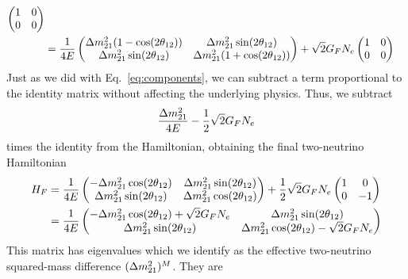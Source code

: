 \begin{align}
            \begin{pmatrix}
            1 & 0 \\
            0 & 0 \\
        \end{pmatrix} \nonumber \\
            &= 
        \frac{1}{4E}
            \begin{pmatrix}
                \dm_{21} (1-\cos(2\theta_{12}))& \dm_{21}  \sin(2\theta_{12}) \\ 
                \dm_{21}  \sin(2\theta_{12}) & \dm_{21} (1+\cos(2\theta_{12})) \\ 
            \end{pmatrix} + \sqrt{2}G_F N_e 
            \begin{pmatrix}
            1 & 0 \\
            0 & 0 \\
        \end{pmatrix}
\end{align}
Just as we did with Eq.~\ref{eq:components}, we can subtract a term proportional to the identity matrix without affecting the underlying physics. Thus, we subtract
\begin{align}
    \frac{\dm[21]}{4E} - \frac{1}{2}\sqrt{2}G_F N_e
\end{align}
times the identity from the Hamiltonian, obtaining the final two-neutrino Hamiltonian
\begin{align}
    H_F &= \frac{1}{4E}
    \begin{pmatrix}
        -\dm_{21} \cos(2\theta_{12}) & \dm_{21}  \sin(2\theta_{12}) \\ 
        \dm_{21}  \sin(2\theta_{12}) & \dm_{21} \cos(2\theta_{12}) \\ 
    \end{pmatrix} + \frac{1}{2}\sqrt{2}G_F N_e 
    \begin{pmatrix}
    1 & 0 \\
    0 & -1 \\
    \end{pmatrix} \nonumber \\
    &= \frac{1}{4E}
    \begin{pmatrix}
        -\dm_{21} \cos(2\theta_{12}) + \sqrt{2}G_F N_e  & \dm_{21}  \sin(2\theta_{12}) \\ 
        \dm_{21}  \sin(2\theta_{12}) & \dm_{21} \cos(2\theta_{12}) - \sqrt{2}G_F N_e  \\ 
    \end{pmatrix}
\end{align}
This matrix has eigenvalues which we identify as the effective two-neutrino squared-mass difference $(\dm[21])^M$. They are 

